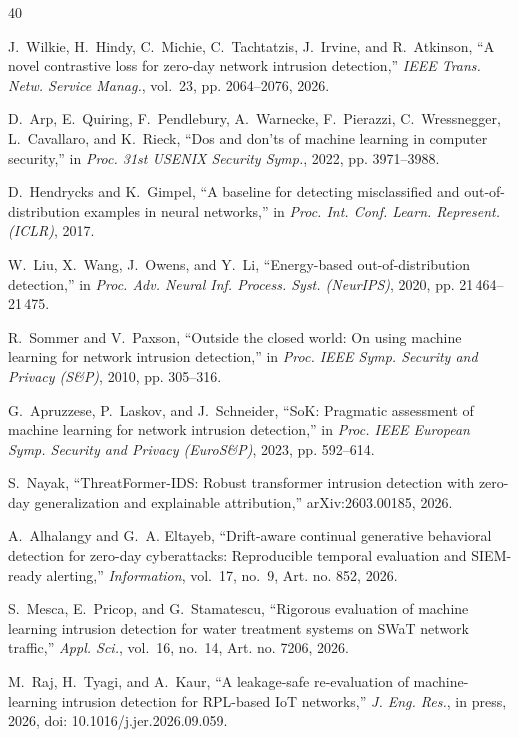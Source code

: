 \begin{thebibliography}{40}

J.~Wilkie, H.~Hindy, C.~Michie, C.~Tachtatzis, J.~Irvine, and R.~Atkinson, ``A novel contrastive loss for zero-day network intrusion detection,'' \emph{IEEE Trans. Netw. Service Manag.}, vol.~23, pp. 2064--2076, 2026.

D.~Arp, E.~Quiring, F.~Pendlebury, A.~Warnecke, F.~Pierazzi, C.~Wressnegger, L.~Cavallaro, and K.~Rieck, ``Dos and don'ts of machine learning in computer security,'' in \emph{Proc. 31st USENIX Security Symp.}, 2022, pp. 3971--3988.

D.~Hendrycks and K.~Gimpel, ``A baseline for detecting misclassified and out-of-distribution examples in neural networks,'' in \emph{Proc. Int. Conf. Learn. Represent. (ICLR)}, 2017.

W.~Liu, X.~Wang, J.~Owens, and Y.~Li, ``Energy-based out-of-distribution detection,'' in \emph{Proc. Adv. Neural Inf. Process. Syst. (NeurIPS)}, 2020, pp. 21\,464--21\,475.

R.~Sommer and V.~Paxson, ``Outside the closed world: On using machine learning for network intrusion detection,'' in \emph{Proc. IEEE Symp. Security and Privacy (S\&P)}, 2010, pp. 305--316.

G.~Apruzzese, P.~Laskov, and J.~Schneider, ``SoK: Pragmatic assessment of machine learning for network intrusion detection,'' in \emph{Proc. IEEE European Symp. Security and Privacy (EuroS\&P)}, 2023, pp. 592--614.

S.~Nayak, ``ThreatFormer-IDS: Robust transformer intrusion detection with zero-day generalization and explainable attribution,'' arXiv:2603.00185, 2026.

A.~Alhalangy and G.~A. Eltayeb, ``Drift-aware continual generative behavioral detection for zero-day cyberattacks: Reproducible temporal evaluation and SIEM-ready alerting,'' \emph{Information}, vol.~17, no.~9, Art. no. 852, 2026.

S.~Mesca, E.~Pricop, and G.~Stamatescu, ``Rigorous evaluation of machine learning intrusion detection for water treatment systems on SWaT network traffic,'' \emph{Appl. Sci.}, vol.~16, no.~14, Art. no. 7206, 2026.

M.~Raj, H.~Tyagi, and A.~Kaur, ``A leakage-safe re-evaluation of machine-learning intrusion detection for RPL-based IoT networks,'' \emph{J. Eng. Res.}, in press, 2026, doi: 10.1016/j.jer.2026.09.059.


\end{thebibliography}
